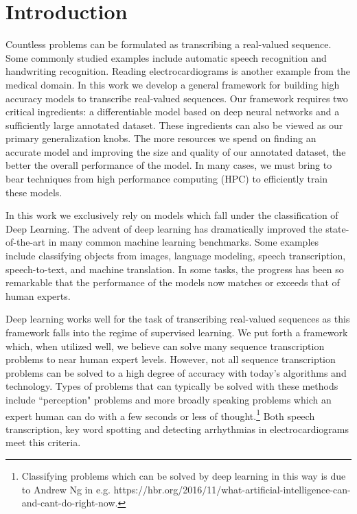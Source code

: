 \chapter{Introduction}

Countless problems can be formulated as transcribing a real-valued sequence.
Some commonly studied examples include automatic speech recognition and
handwriting recognition. Reading electrocardiograms is another example from the
medical domain. In this work we develop a general framework for building high
accuracy models to transcribe real-valued sequences. Our framework requires two
critical ingredients: a differentiable model based on deep neural networks and
a sufficiently large annotated dataset. These ingredients can also be viewed as
our primary generalization knobs. The more resources we spend on finding an
accurate model and improving the size and quality of our annotated dataset, the
better the overall performance of the model. In many cases, we must bring to
bear techniques from high performance computing (HPC) to efficiently train
these models.

In this work we exclusively rely on models which fall under the classification
of Deep Learning. The advent of deep learning has dramatically improved the
state-of-the-art in many common machine learning benchmarks. Some examples
include classifying objects from images, language modeling, speech
transcription, speech-to-text, and machine translation. In some tasks, the
progress has been so remarkable that the performance of the models now matches
or exceeds that of human experts.

Deep learning works well for the task of transcribing real-valued sequences as
this framework falls into the regime of supervised learning. We put forth a
framework which, when utilized well, we believe can solve many sequence
transcription problems to near human expert levels. However, not all sequence
transcription problems can be solved to a high degree of accuracy with today's
algorithms and technology. Types of problems that can typically be solved with
these methods include ``perception" problems and more broadly speaking problems
which an expert human can do with a few seconds or less of
thought.\footnote{Classifying problems which can be solved by deep learning in
this way is due to Andrew Ng in e.g.
https://hbr.org/2016/11/what-artificial-intelligence-can-and-cant-do-right-now.}
Both speech transcription, key word spotting and detecting arrhythmias in
electrocardiograms meet this criteria.

